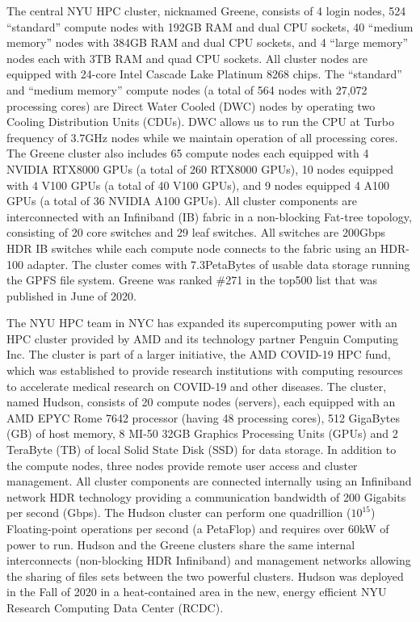 The central NYU HPC cluster, nicknamed Greene, consists of 4 login nodes, 524 “standard'' compute nodes with 192GB RAM and dual CPU sockets, 40 “medium memory” nodes with 384GB RAM and dual CPU sockets, and 4 “large memory” nodes each with 3TB RAM and quad CPU sockets. All cluster nodes are equipped with 24-core Intel Cascade Lake Platinum 8268 chips. The “standard” and “medium memory” compute nodes (a total of 564 nodes with 27,072 processing cores) are Direct Water Cooled (DWC) nodes by operating two Cooling Distribution Units (CDUs). DWC allows us to run the CPU at Turbo frequency of 3.7GHz nodes while we maintain operation of all processing cores. The Greene cluster also includes 65 compute nodes each equipped with 4 NVIDIA RTX8000 GPUs (a total of 260 RTX8000 GPUs), 10 nodes equipped with 4 V100 GPUs (a total of 40 V100 GPUs), and 9 nodes equipped 4 A100 GPUs (a total of 36 NVIDIA A100 GPUs). All cluster components are interconnected with an Infiniband (IB) fabric in a non-blocking Fat-tree topology, consisting of 20 core switches and 29 leaf switches. All switches are 200Gbps HDR IB switches while each compute node connects to the fabric using an HDR-100 adapter. The cluster comes with 7.3PetaBytes of usable data storage running the GPFS file system. Greene was ranked \#271 in the top500 list that was published in June of 2020.

The NYU HPC team in NYC has expanded its supercomputing power with an HPC cluster provided by AMD and its technology partner Penguin Computing Inc. The cluster is part of a larger initiative, the AMD COVID-19 HPC fund, which was established to provide research institutions with computing resources to accelerate medical research on COVID-19 and other diseases. The cluster, named Hudson, consists of 20 compute nodes (servers), each equipped with an AMD EPYC Rome 7642 processor (having 48 processing cores), 512 GigaBytes (GB) of host memory, 8 MI-50 32GB Graphics Processing Units (GPUs) and 2 TeraByte (TB) of local Solid State Disk (SSD) for data storage. In addition to the compute nodes, three nodes provide remote user access and cluster management. All cluster components are connected internally using an Infiniband network HDR technology providing a communication bandwidth of 200 Gigabits per second (Gbps). The Hudson cluster can perform one quadrillion ($10^15$) Floating-point operations per second (a PetaFlop) and requires over 60kW of power to run. Hudson and the Greene clusters share the same internal interconnects (non-blocking HDR Infiniband) and management networks allowing the sharing of files sets between the two powerful clusters. Hudson was deployed in the Fall of 2020  in a heat-contained area in the new, energy efficient NYU Research Computing Data Center (RCDC).

